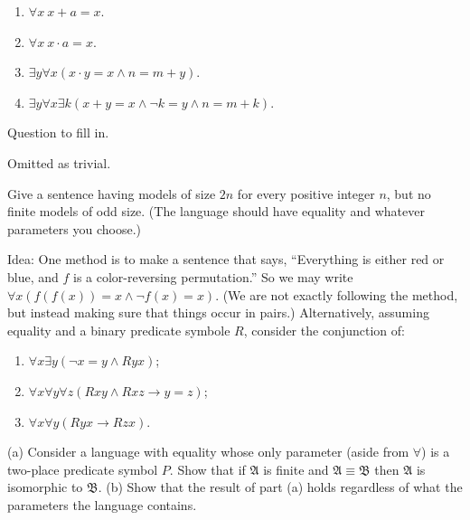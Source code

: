 \begin{enumerate}
  \item $\forall x\ x+a=x$.
  \item $\forall x\ x\cdot a=x$.
  \item $\exists y\forall x(x\cdot y=x\wedge n=m+y)$.
  \item $\exists y\forall x\exists k(x+y=x\wedge \neg k=y\wedge n=m+k)$.
\end{enumerate}


\setcounter{exercise}{12}

\begin{exercise}
  Question to fill in.
\end{exercise}

Omitted as trivial.

\setcounter{exercise}{15}

\begin{exercise}
  Give a sentence having models of size $2n$ for every positive integer $n$, but no finite models of odd size. (The language should have equality and whatever parameters you choose.)
\end{exercise}

Idea: One method is to make a sentence that says, “Everything is either red or blue, and $f$ is a color-reversing permutation.” So we may write $\forall x(f(f(x))=x\wedge\neg f(x)=x)$. (We are not exactly following the method, but instead making sure that things occur in pairs.) Alternatively, assuming equality and a binary predicate symbole $R$, consider the conjunction of:
\begin{enumerate}[label=(\alph*)]
  \item $\forall x\exists y(\neg x=y\wedge Ryx)$;
  \item $\forall x\forall y\forall z(Rxy\wedge Rxz\to y=z)$;
  \item $\forall x\forall y(Ryx\to Rzx)$.
\end{enumerate}

\begin{exercise}
  (a) Consider a language with equality whose only parameter (aside from $\forall$) is a two-place predicate symbol $P$. Show that if $\mathfrak{A}$ is finite and $\mathfrak{A}\equiv \mathfrak{B}$ then $\mathfrak{A}$ is isomorphic to $\mathfrak{B}$.
  (b) Show that the result of part (a) holds regardless of what the parameters the language contains.
\end{exercise}

